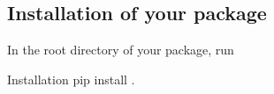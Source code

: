 

\subsection{Installation of your package}

In the root directory of your package, run

\begin{codeonly}{Installation}
pip install .
\end{codeonly}
